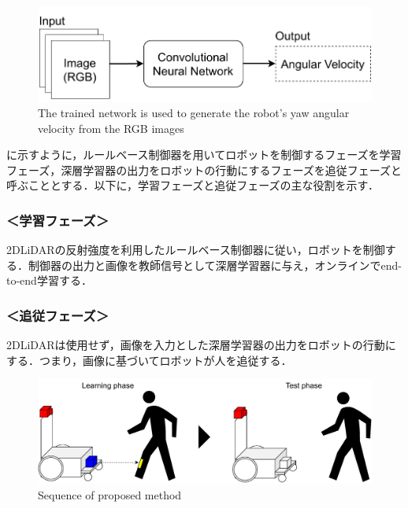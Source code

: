   \begin{figure}[h]
    \centering
    \includegraphics[keepaspectratio, scale=0.50] {images/pdf/RobotGuidance_simple_system}
    \captionsetup{justification=raggedright} %
    \caption{The trained network is used to generate the robot's yaw angular velocity from the RGB images}
    \label{Fig:RobotGuidance_simple_system}
  \end{figure}

  に示すように，ルールベース制御器を用いてロボットを制御するフェーズを学習フェーズ，深層学習器の出力をロボットの行動にするフェーズを追従フェーズと呼ぶこととする．以下に，学習フェーズと追従フェーズの主な役割を示す．

  \subsubsection*{＜学習フェーズ＞}
  2DLiDARの反射強度を利用したルールベース制御器に従い，ロボットを制御する．制御器の出力と画像を教師信号として深層学習器に与え，オンラインでend-to-end学習する．
  
  \subsubsection*{＜追従フェーズ＞}
  2DLiDARは使用せず，画像を入力とした深層学習器の出力をロボットの行動にする．つまり，画像に基づいてロボットが人を追従する．

  \begin{figure}[h]
    \centering
    \includegraphics[keepaspectratio, scale=0.35] {images/pdf/RobotGuidance_all_system}
    \captionsetup{justification=raggedright} %
    \caption{Sequence of proposed method}
    \label{Fig:RobotGuidance_all_system}
  \end{figure}

\newpage
